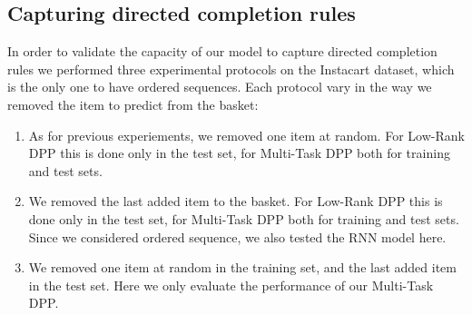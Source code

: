 
\subsection{Capturing directed completion rules}

In order to validate the capacity of our model to capture directed completion rules we performed three experimental protocols 
on the Instacart dataset, which is the only one to have ordered sequences. Each protocol vary in the way we removed the item to predict from the basket:
\begin{enumerate}
	\item As for previous experiements, we removed one item at random. For Low-Rank DPP this is done only in the test set, for Multi-Task DPP both for training and test sets.
	\item We removed the last added item to the basket. For Low-Rank DPP this is done only in the test set, for Multi-Task DPP both for training and test sets. Since we considered ordered sequence, we also tested the RNN model here.
	\item We removed one item at random in the training set, and the last added item in the test set. Here we only evaluate the performance of our Multi-Task DPP.
\end{enumerate}

